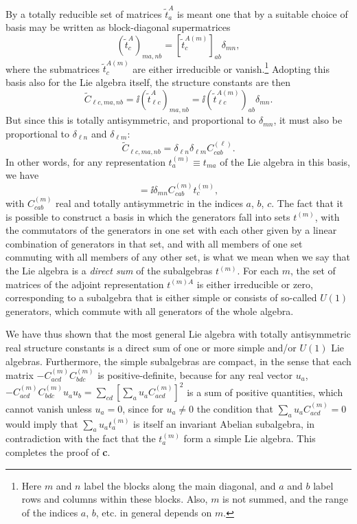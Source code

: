 By a totally reducible set of matrices $\widetilde t^A_a$ is meant one that by a suitable choice of basis may be written as block-diagonal supermatrices
\begin{equation}
 (\widetilde t^A_c)_{ma,nb}
 =[\widetilde t^{A(m)}_c]_{ab}\delta_{mn},
 \tag{15.A.6}\label{eq:15.A.6}
\end{equation}
where the submatrices $\widetilde t^{A(m)}_c$ are either irreducible or vanish.\footnote{Here $m$ and $n$ label the blocks along the main diagonal, and $a$ and $b$ label rows and columns within these blocks. Also, $m$ is not summed, and the range of the indices $a$, $b$, etc. in general depends on $m$.} Adopting this basis also for the Lie algebra itself, the structure constants are then
\begin{equation}
 \widetilde C_{\ell c,ma,nb}
 =\ii(\widetilde t^A_{\ell c})_{ma,nb}
 =\ii(\widetilde t^{A(m)}_{\ell c})_{ab}\delta_{mn}.
 \tag{15.A.7}\label{eq:15.A.7}
\end{equation}
But since this is totally antisymmetric, and proportional to $\delta_{mn}$, it must also be proportional to $\delta_{\ell n}$ and $\delta_{\ell m}$:
\begin{equation}
 \widetilde C_{\ell c,ma,nb}
 =\delta_{\ell n}\delta_{\ell m}C^{(\ell)}_{cab}.
 \tag{15.A.8}\label{eq:15.A.8}
\end{equation}
In other words, for any representation $t_a^{(m)}\equiv t_{ma}$ of the Lie algebra in this basis, we have
\begin{equation}
 [t_a^{(m)},t_b^{(n)}]
 =\ii\delta_{mn}C^{(m)}_{cab}t_c^{(m)},
 \tag{15.A.9}\label{eq:15.A.9}
\end{equation}
with $C^{(m)}_{cab}$ real and totally antisymmetric in the indices $a$, $b$, $c$. The fact that it is possible to construct a basis in which the generators fall into sets $t^{(m)}$, with the commutators of the generators in one set with each other given by a linear combination of generators in that set, and with all members of one set commuting with all members of any other set, is what we mean when we say that the Lie algebra is a \emph{direct sum} of the subalgebras $t^{(m)}$. For each $m$, the set of matrices of the adjoint representation $t^{(m)A}$ is either irreducible or zero, corresponding to a subalgebra that is either simple or consists of so-called $U(1)$ generators, which commute with all generators of the whole algebra.

We have thus shown that the most general Lie algebra with totally antisymmetric real structure constants is a direct sum of one or more simple and/or $U(1)$ Lie algebras. Furthermore, the simple subalgebras are compact, in the sense that each matrix $-C^{(m)}_{acd}C^{(m)}_{bdc}$ is positive-definite, because for any real vector $u_a$, $-C^{(m)}_{acd}C^{(m)}_{bdc}u_au_b=\sum_{cd}[\sum_a u_aC^{(m)}_{acd}]^2$ is a sum of positive quantities, which cannot vanish unless $u_a=0$, since for $u_a\ne0$ the condition that $\sum_a u_aC^{(m)}_{acd}=0$ would imply that $\sum_a u_at_a^{(m)}$ is itself an invariant Abelian subalgebra, in contradiction with the fact that the $t_a^{(m)}$ form a simple Lie algebra. This completes the proof of \textbf{c}.

